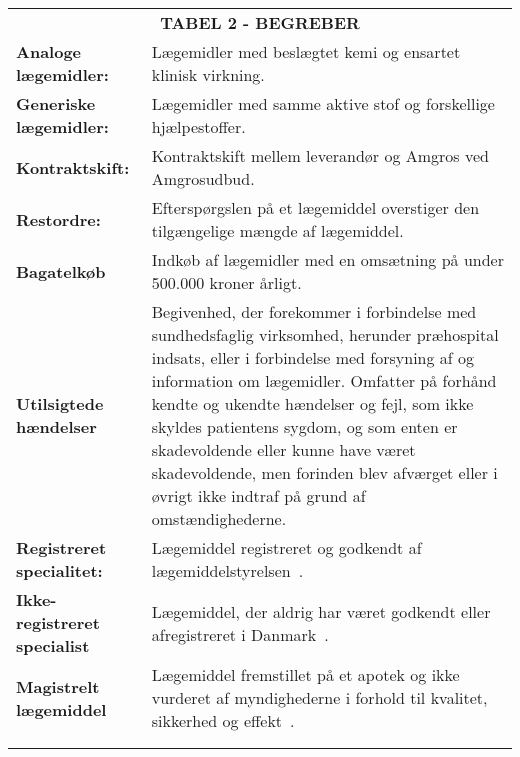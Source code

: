 \begin{table}[H]
\label{table:begreber}
\begin{tabular}{p{4.5cm} p{9.8cm}}
\multicolumn{2}{c}{\cellcolor[HTML]{C0C0C0}\textbf{TABEL 2 - BEGREBER}} \vspace{0.5cm}\\
\textbf{Analoge lægemidler:} & Lægemidler med beslægtet kemi og ensartet klinisk virkning. \vspace{0.5cm} \\
\textbf{Generiske lægemidler:} & Lægemidler med samme aktive stof og forskellige hjælpestoffer.\vspace{0.5cm} \\
\textbf{Kontraktskift:} & Kontraktskift mellem leverandør og Amgros ved Amgrosudbud.  \vspace{0.5cm} \\
\textbf{Restordre:} & Efterspørgslen på et lægemiddel overstiger den tilgængelige mængde af lægemiddel.  \vspace{0.5cm} \\
\textbf{Bagatelkøb} & Indkøb af lægemidler med en omsætning på under 500.000 kroner årligt. \vspace{0.5cm} \\
\textbf{Utilsigtede hændelser} &  Begivenhed, der forekommer i forbindelse med sundhedsfaglig virksomhed, herunder præhospital indsats, eller i forbindelse med forsyning af og information om lægemidler. Omfatter på forhånd kendte og ukendte hændelser og fejl, som ikke skyldes patientens sygdom, og som enten er skadevoldende eller kunne have været skadevoldende, men forinden blev afværget eller i øvrigt ikke indtraf på grund af omstændighederne. %
 \vspace{0.5cm} \\
\textbf{Registreret specialitet:} & Lægemiddel registreret og godkendt af lægemiddelstyrelsen~\citep{Laegemiddelinformaion2017}. \vspace{0.5cm} \\
\textbf{Ikke-registreret specialist} & Lægemiddel, der aldrig har været godkendt eller afregistreret i Danmark~\citep{Laegemiddelinformaion2017}. \vspace{0.5cm} \\
\textbf{Magistrelt lægemiddel} & Lægemiddel fremstillet på et apotek og ikke vurderet af myndighederne i forhold til kvalitet, sikkerhed og effekt~\citep{Laegemiddelinformaion2017}. \vspace{0.5cm} \\
& \vspace{0.5cm} \\
 
& \vspace{0.5cm} \\
\end{tabular}
\end{table}


